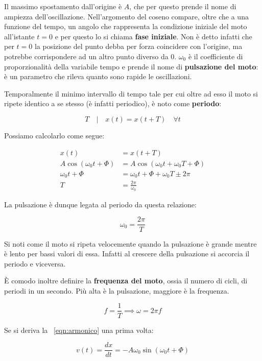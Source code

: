 Il massimo spostamento dall'origine è $A$, che per questo prende il nome di ampiezza dell'oscillazione. Nell'argomento del coseno compare, oltre che a una funzione del tempo, un angolo che rappresenta la condizione iniziale del moto all'istante $t=0$ e per questo lo si chiama \textbf{fase iniziale}. Non è detto infatti che per $t=0$ la posizione del punto debba per forza coincidere con l'origine, ma potrebbe corrispondere ad un altro punto diverso da $0$. $\omega_0$ è il coefficiente di proporzionalità della variabile tempo e prende il nome di \textbf{pulsazione del moto}: è un parametro che rileva quanto sono rapide le oscillazioni.

Temporalmente il minimo intervallo di tempo tale per cui oltre ad esso il moto si ripete identico a se stesso (è infatti periodico),  è noto come \textbf{periodo}:

\[
	T \quad | \quad x(t)=x(t+T) \quad \forall t
\]

Possiamo calcolarlo come segue:

\begin{align*}
	x(t) &= x(t+T) \\
	A\cos(\omega_0 t+\Phi) &= A\cos(\omega_0 t +\omega_0 T+\Phi) \\
	\omega_0 t+\Phi &= \omega_0 t+\Phi+\omega_0 T \pm 2\pi \\
	T &= \frac{2\pi}{\omega_0}
\end{align*}

La pulsazione è dunque legata al periodo da questa relazione:

\[
	\boxed{\omega_0=\frac{2\pi}{T}}
\]

Si noti come il moto si ripeta velocemente quando la pulsazione è grande mentre è lento per bassi valori di essa. Infatti al crescere della pulsazione si accorcia il periodo e viceversa.

È comodo inoltre definire la \textbf{frequenza del moto}, ossia il numero di cicli, di periodi in un secondo. Più alta è la pulsazione, maggiore è la frequenza.

\[
	\boxed{f=\frac{1}{T}} \implies \boxed{\omega=2\pi f}
\]

Se si deriva la ~\eqref{eqn:armonico} una prima volta:

\[
	v(t)=\frac{dx}{dt}=-A\omega_0\sin(\omega_0 t+\Phi)
\]

